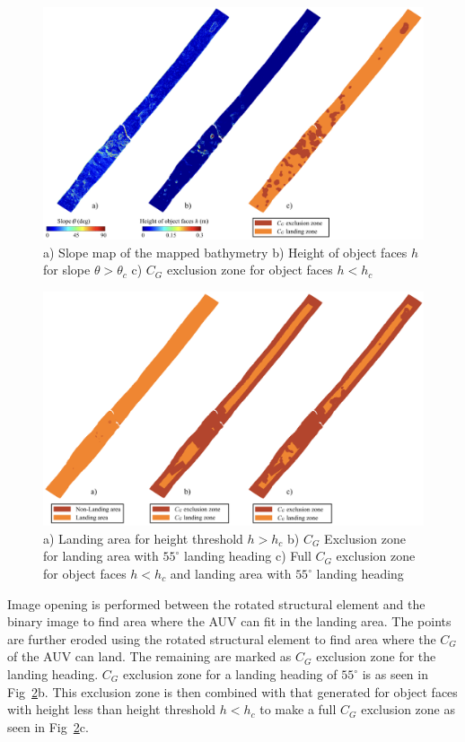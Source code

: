 \begin{figure}[!ht]
\centering
\includegraphics[width=5.5in]{./images/mehul20.png}
\caption{a) Slope map of the mapped bathymetry b) Height of object faces $h$ for slope $\theta > \theta_c$ c) $C_G$ exclusion zone for object faces $h < h_c$}
\label{f:mehul20}
\end{figure}

\begin{figure}[!ht]
\centering
\includegraphics[width=5.5in]{./images/mehul21.png}
\caption{a) Landing area for height threshold $h > h_c$ b)  $C_G$ Exclusion zone for landing area with $55^\circ$ landing heading  c) Full $C_G$ exclusion zone for object faces $h < h_c$ and landing area with $55^\circ$ landing heading}
\label{f:mehul21}
\end{figure}

 Image opening is performed between the rotated structural element and the binary image to find area where the AUV can fit in the landing area. The points are further eroded using the rotated structural element to find area where the $C_G$ of the AUV can land. The remaining are marked as  $C_G$ exclusion zone for the landing heading. $C_G$ exclusion zone for a landing heading of $55^\circ$ is as seen in Fig~\ref{f:mehul21}b. This exclusion zone is then combined with that generated for object faces with height less than height threshold $h < h_c$ to make a full $C_G$ exclusion zone as seen in Fig~\ref{f:mehul21}c. 
 
